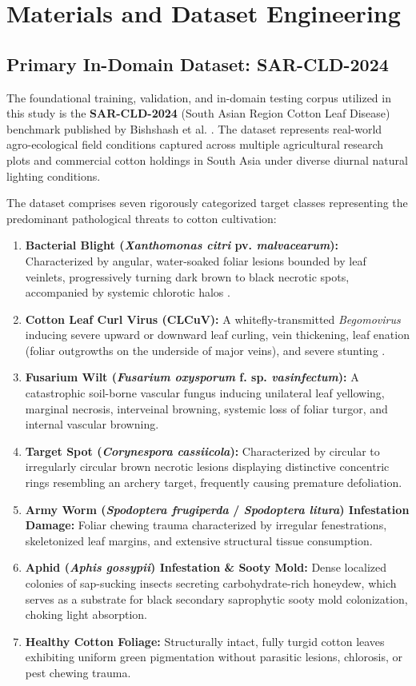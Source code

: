 \documentclass[journal,10pt,twocolumn]{IEEEtran}
\begin{document}
\section{Materials and Dataset Engineering}

\subsection{Primary In-Domain Dataset: SAR-CLD-2024}
The foundational training, validation, and in-domain testing corpus utilized in this study is the \textbf{SAR-CLD-2024} (South Asian Region Cotton Leaf Disease) benchmark published by Bishshash et al. \cite{bishshash2024sar}. The dataset represents real-world agro-ecological field conditions captured across multiple agricultural research plots and commercial cotton holdings in South Asia under diverse diurnal natural lighting conditions.

The dataset comprises seven rigorously categorized target classes representing the predominant pathological threats to cotton cultivation:
\begin{enumerate}[leftmargin=*]
    \item \textbf{Bacterial Blight (\textit{Xanthomonas citri} pv. \textit{malvacearum}):} Characterized by angular, water-soaked foliar lesions bounded by leaf veinlets, progressively turning dark brown to black necrotic spots, accompanied by systemic chlorotic halos \cite{delannoy2005cotton}.
    \item \textbf{Cotton Leaf Curl Virus (CLCuV):} A whitefly-transmitted \textit{Begomovirus} inducing severe upward or downward leaf curling, vein thickening, leaf enation (foliar outgrowths on the underside of major veins), and severe stunting \cite{sattar2013cotton}.
    \item \textbf{Fusarium Wilt (\textit{Fusarium oxysporum} f. sp. \textit{vasinfectum}):} A catastrophic soil-borne vascular fungus inducing unilateral leaf yellowing, marginal necrosis, interveinal browning, systemic loss of foliar turgor, and internal vascular browning.
    \item \textbf{Target Spot (\textit{Corynespora cassiicola}):} Characterized by circular to irregularly circular brown necrotic lesions displaying distinctive concentric rings resembling an archery target, frequently causing premature defoliation.
    \item \textbf{Army Worm (\textit{Spodoptera frugiperda} / \textit{Spodoptera litura}) Infestation Damage:} Foliar chewing trauma characterized by irregular fenestrations, skeletonized leaf margins, and extensive structural tissue consumption.
    \item \textbf{Aphid (\textit{Aphis gossypii}) Infestation \& Sooty Mold:} Dense localized colonies of sap-sucking insects secreting carbohydrate-rich honeydew, which serves as a substrate for black secondary saprophytic sooty mold colonization, choking light absorption.
    \item \textbf{Healthy Cotton Foliage:} Structurally intact, fully turgid cotton leaves exhibiting uniform green pigmentation without parasitic lesions, chlorosis, or pest chewing trauma.
\end{enumerate}
\end{document}
